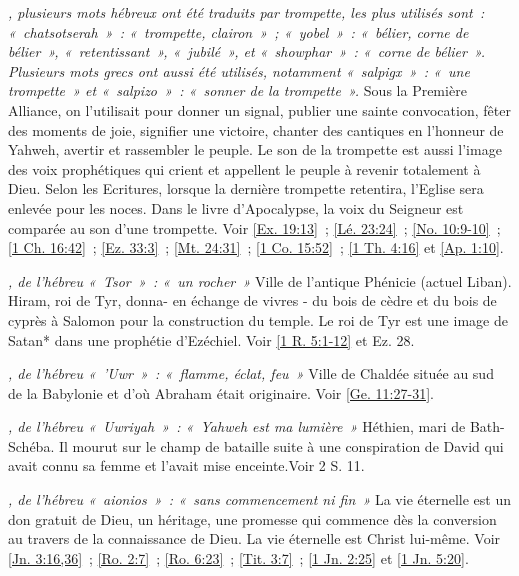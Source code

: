 \begin{multicols}{2}
\textit{, plusieurs mots hébreux ont été traduits par trompette, les plus utilisés sont~: «~chatsotserah~»~: «~trompette, clairon~»~; «~yobel~»~: «~bélier, corne de bélier~», «~retentissant~», «~jubilé~», et «~showphar~»~: «~corne de bélier~». Plusieurs mots grecs ont aussi été utilisés, notamment «~salpigx~»~: «~une trompette~» et «~salpizo~»~: «~sonner de la trompette~».}\newline
Sous la Première Alliance, on l'utilisait pour donner un signal, publier une sainte convocation, fêter des moments de joie, signifier une victoire, chanter des cantiques en l'honneur de Yahweh, avertir et rassembler le peuple. Le son de la trompette est aussi l'image des voix prophétiques qui crient et appellent le peuple à revenir totalement à Dieu. Selon les Ecritures, lorsque la dernière trompette retentira, l'Eglise sera enlevée pour les noces. Dans le livre d'Apocalypse, la voix du Seigneur est comparée au son d'une trompette. Voir \vref{Ex. 19:13}~; \vref{Lé. 23:24}~; \vref{No. 10:9-10}~; \vref{1 Ch. 16:42}~; \vref{Ez. 33:3}~; \vref{Mt. 24:31}~; \vref{1 Co. 15:52}~; \vref{1 Th. 4:16} et \vref{Ap. 1:10}.

\textit{, de l'hébreu «~Tsor~»~: «~un rocher~»}\newline
Ville de l'antique Phénicie (actuel Liban). Hiram, roi de Tyr, donna- en échange de vivres - du bois de cèdre et du bois de cyprès à Salomon pour la construction du temple. Le roi de Tyr est une image de Satan* dans une prophétie d'Ezéchiel. Voir \vref{1 R. 5:1-12} et Ez. 28.

\textit{, de l'hébreu «~'Uwr~»~: «~flamme, éclat, feu~»}\newline
Ville de Chaldée située au sud de la Babylonie et d'où Abraham était originaire. Voir \vref{Ge. 11:27-31}.

\textit{, de l'hébreu «~Uwriyah~»~: «~Yahweh est ma lumière~»}\newline
Héthien, mari de Bath-Schéba. Il mourut sur le champ de bataille suite à une conspiration de David qui avait connu sa femme et l'avait mise enceinte.\newline Voir 2 S. 11.

\textit{, de l'hébreu «~aionios~»~: «~sans commencement ni fin~»}\newline
La vie éternelle est un don gratuit de Dieu, un héritage, une promesse qui commence dès la conversion au travers de la connaissance de Dieu. La vie éternelle est Christ lui-même. Voir \vref{Jn. 3:16,36}~; \vref{Ro. 2:7}~; \vref{Ro. 6:23}~; \vref{Tit. 3:7}~; \vref{1 Jn. 2:25} et \vref{1 Jn. 5:20}.


\end{multicols}

